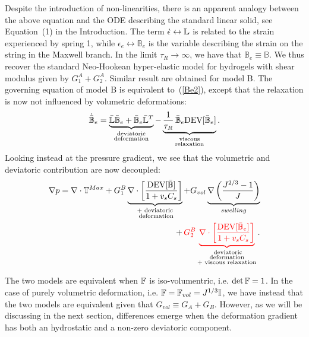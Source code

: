 Despite the introduction of non-linearities, there is an apparent analogy between the above equation and the ODE describing the standard linear solid, see Equation~(1) in the Introduction. The term $\dot{\epsilon} \leftrightarrow \mathbb{L}$ is related to the strain experienced by spring 1, while $\epsilon_e  \leftrightarrow \mathbb{B}_e$ is the variable describing the strain on the string in the Maxwell branch. In the limit $\tau_R\rightarrow \infty$, we have that $\mathbb{B}_e\equiv\mathbb{B}$. We thus recover the standard Neo-Hookean hyper-elastic model for hydrogels with shear modulus given by $G^A_1+G^A_2$. Similar result are obtained for model B. The governing equation of model B is equivalent to~(\ref{Be2}), except that the relaxation is now not influenced by volumetric deformations:
\begin{equation}
\dot{\bar{\mathbb{B}}}_e=\underbrace{\bar{\mathbb{L}}\bar{\mathbb{B}}_e + \bar{\mathbb{B}}_e \bar{\mathbb{L}}^T}_{\substack{\text{deviatoric}\\\text{deformation}}} - \underbrace{\frac{1}{\tau_R} \,\bar{\mathbb{B}}_e\text{DEV}[\bar{\mathbb{B}}_e]}_{\substack{\text{viscous}\\\text{relaxation}}}.
\end{equation}
Looking instead at the pressure gradient, we see that the volumetric and deviatoric contribution are now decoupled:
\begin{equation}
\begin{aligned}
\nabla p=\nabla \cdot \mathbb{T}^{Max} + G_1^B\underbrace{ \nabla \cdot \left[\frac{\text{DEV}[\bar{\mathbb{B}}]}{1+v_sC_s}\right]}_{\substack{\text{+ deviatoric}\\\text{ deformation}}}+ G_{vol}\underbrace{\nabla \left(\frac{J^{2/3}-1}{J}\right)}_{swelling} \\
+ \,\color{red} G_2^B \underbrace{\nabla \cdot\left[\frac{\text{DEV}[\bar{\mathbb{B}}_e]}{1+v_sC_s}\right]}_{\color{black}\substack{\text{ deviatoric}\\\text{deformation}\\\text{+ viscous relaxation}}}\color{black}.
\end{aligned}
\end{equation}

The two models are equivalent when $\mathbb{F}$ is iso-volumentric, i.e. $\det \mathbb{F}=1$. In the case of purely volumetric deformation, i.e. $\mathbb{F}=\mathbb{F}_{vol}=J^{1/3}\mathbb{I}$, we have instead that the two models are equivalent given that $G_{vol}\equiv G_A +G_B$. However, as we will be discussing in the next section, differences emerge when the deformation gradient has both an hydrostatic and a non-zero deviatoric component. 

